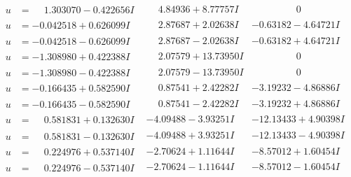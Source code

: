 \documentclass[1p]{elsarticle_modified}
\theoremstyle{definition}
\begin{document}
$$\begin{array}{c|c|c}
\begin{aligned}
u &= \phantom{-}1.303070 - 0.422656 I\end{aligned}
 & \phantom{-}4.84936 + 8.77757 I & \phantom{-0.000000 } 0 \\ \hline\begin{aligned}
u &= -0.042518 + 0.626099 I\end{aligned}
 & \phantom{-}2.87687 + 2.02638 I & -0.63182 - 4.64721 I \\ \hline\begin{aligned}
u &= -0.042518 - 0.626099 I\end{aligned}
 & \phantom{-}2.87687 - 2.02638 I & -0.63182 + 4.64721 I \\ \hline\begin{aligned}
u &= -1.308980 + 0.422388 I\end{aligned}
 & \phantom{-}2.07579 + 13.73950 I & \phantom{-0.000000 } 0 \\ \hline\begin{aligned}
u &= -1.308980 - 0.422388 I\end{aligned}
 & \phantom{-}2.07579 - 13.73950 I & \phantom{-0.000000 } 0 \\ \hline\begin{aligned}
u &= -0.166435 + 0.582590 I\end{aligned}
 & \phantom{-}0.87541 + 2.42282 I & -3.19232 - 4.86886 I \\ \hline\begin{aligned}
u &= -0.166435 - 0.582590 I\end{aligned}
 & \phantom{-}0.87541 - 2.42282 I & -3.19232 + 4.86886 I \\ \hline\begin{aligned}
u &= \phantom{-}0.581831 + 0.132630 I\end{aligned}
 & -4.09488 - 3.93251 I & -12.13433 + 4.90398 I \\ \hline\begin{aligned}
u &= \phantom{-}0.581831 - 0.132630 I\end{aligned}
 & -4.09488 + 3.93251 I & -12.13433 - 4.90398 I \\ \hline\begin{aligned}
u &= \phantom{-}0.224976 + 0.537140 I\end{aligned}
 & -2.70624 + 1.11644 I & -8.57012 + 1.60454 I \\ \hline\begin{aligned}
u &= \phantom{-}0.224976 - 0.537140 I\end{aligned}
 & -2.70624 - 1.11644 I & -8.57012 - 1.60454 I \\ \hline\begin{aligned}

\end{aligned}
\end{array}$$
\end{document}
